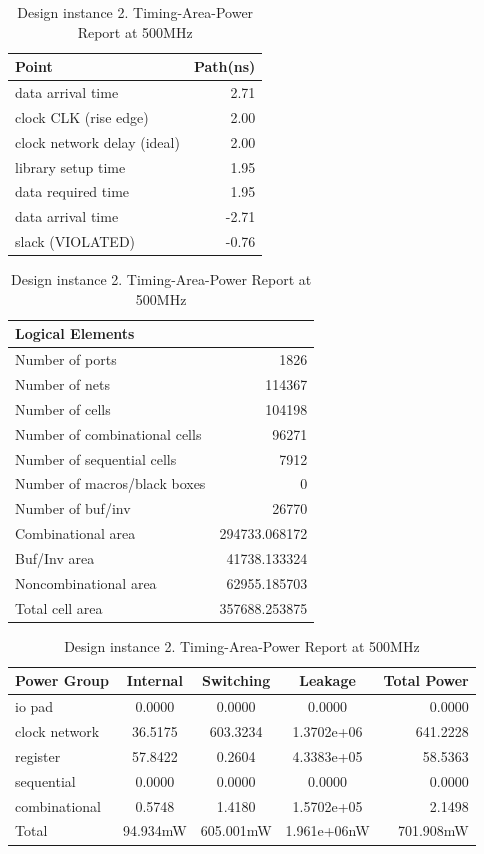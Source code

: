\documentclass[journal,comsoc]{IEEEtran}
\begin{document}
\begin{table}[t!]
	\centering
	\caption{Design instance 2. Timing-Area-Power Report at 500MHz}
	\label{tab:reporte3} 		
	\begin{tabular}{@{}lr@{}}
		Point 						&Path(ns)\\
		\hline\hline
		data arrival time   		&2.71\\ 
		clock CLK (rise edge)  		&2.00\\
		clock network delay (ideal) &2.00\\
		library setup time			&1.95\\
		\hline
		data required time			&1.95\\
		data arrival time           &-2.71\\
		\hline
		slack (VIOLATED)            &-0.76\\	
		\hline
	\end{tabular}
	
	\begin{tabular}{@{}lr@{}}\\
		Logical Elements\\
		\hline\hline
		Number of ports                &1826\\
		Number of nets                 &114367\\
		Number of cells                &104198\\
		Number of combinational cells  &96271\\
		Number of sequential cells     &7912\\
		Number of macros/black boxes   &0\\
		Number of buf/inv              &26770\\
		\hline
		Combinational area             &294733.068172\\
		Buf/Inv area                   &41738.133324\\
		Noncombinational area          &62955.185703\\
		\hline
		Total cell area                &357688.253875\\	
		\hline
	\end{tabular}
	
	\begin{tabular}{@{}lcccr@{}}\\
		Power Group		 &Internal 	&Switching 	&Leakage		&Total Power\\
		\hline\hline
		io pad           &0.0000    &0.0000     &0.0000    		&0.0000\\
		clock network    &36.5175   &603.3234   &1.3702e+06 	&641.2228\\
		register         &57.8422   &0.2604     &4.3383e+05 	&58.5363\\  
		sequential       &0.0000    &0.0000     &0.0000     	&0.0000\\  
		combinational    &0.5748    &1.4180     &1.5702e+05 	&2.1498\\ 
		\hline
		Total            &94.934mW  &605.001mW  &1.961e+06nW	&701.908mW\\	
		\hline
	\end{tabular}
\end{table}
\end{document}
